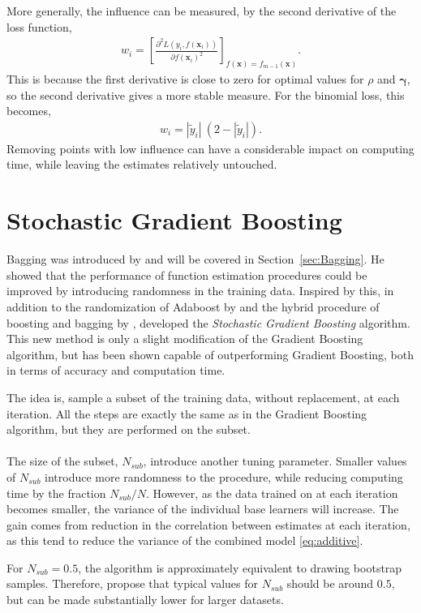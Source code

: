 More generally, the influence can be measured, by the second derivative of the loss function,
\begin{align}
  w_i = \left[ \frac{\partial^2 L(y_i, f(\mathbf{x}_i)) }{\partial f(\mathbf{x}_i)^2}  \right]_{f(\mathbf{x}) = f_{m-1}(\mathbf{x})}.
\end{align}
This is because the first derivative is close to zero for optimal values for $\rho$ and $\bm \gamma$, so the second derivative gives a more stable measure.  For the binomial loss, this becomes,
\begin{align}
  w_i = |\tilde y_i| \: (2 - |\tilde y_i|). 
\end{align}
Removing points with low influence can have a considerable impact on computing time, while leaving the estimates relatively untouched. 

\section{Stochastic Gradient Boosting}
\label{sec:Stochastic Gradient Boosting}
Bagging was introduced by \cite{Breiman1996} and will be covered in Section~\ref{sec:Bagging}. He showed that the performance of function estimation procedures could be improved by introducing randomness in the training data. 
Inspired by this, in addition to the randomization of Adaboost by \cite{freund1996} and the hybrid procedure of boosting and bagging by \cite{breiman1999}, \cite{FriedmanStochBoost} developed the \textit{Stochastic Gradient Boosting} algorithm.
This new method is only a slight modification of the Gradient Boosting algorithm, but has been shown capable of outperforming Gradient Boosting, both in terms of accuracy and computation time.  

The idea is, sample a subset of the training data, without replacement, at each iteration. All the steps are exactly the same as in the Gradient Boosting algorithm, but they are performed on the subset. \\
\\
The size of the subset, $N_{sub}$, introduce another tuning parameter. Smaller values of $N_{sub}$ introduce more randomness to the procedure, while reducing computing time by the fraction $N_{sub}/N$. However, as the data trained on at each iteration becomes smaller, the variance of the individual base learners will increase. The gain comes from reduction in the correlation between estimates at each iteration, as this tend to reduce the variance of the combined model \eqref{eq:additive}.

For $N_{sub} = 0.5$, the algorithm is approximately equivalent to drawing bootstrap samples. Therefore, \cite{modstat} propose that typical values for $N_{sub}$ should be around $0.5$, but can be made substantially lower for larger datasets.

